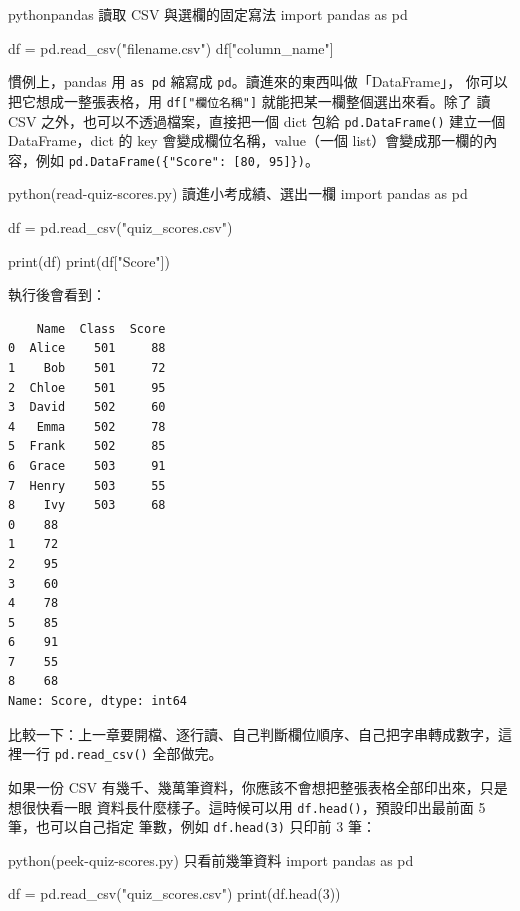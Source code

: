 \begin{code}{python}{pandas 讀取 CSV 與選欄的固定寫法}
import pandas as pd

df = pd.read_csv("filename.csv")
df["column_name"]
\end{code}

慣例上，pandas 用 \texttt{as pd} 縮寫成 \texttt{pd}。讀進來的東西叫做「DataFrame」，
你可以把它想成一整張表格，用 \texttt{df["欄位名稱"]} 就能把某一欄整個選出來看。除了
讀 CSV 之外，也可以不透過檔案，直接把一個 dict 包給 \texttt{pd.DataFrame()} 建立一個
DataFrame，dict 的 key 會變成欄位名稱，value（一個 list）會變成那一欄的內容，例如
\texttt{pd.DataFrame(\{"Score": [80, 95]\})}。

\begin{example}{python}{(read-quiz-scores.py) 讀進小考成績、選出一欄}
import pandas as pd

df = pd.read_csv("quiz_scores.csv")

print(df)
print(df["Score"])
\end{example}

執行後會看到：

\begin{verbatim}
    Name  Class  Score
0  Alice    501     88
1    Bob    501     72
2  Chloe    501     95
3  David    502     60
4   Emma    502     78
5  Frank    502     85
6  Grace    503     91
7  Henry    503     55
8    Ivy    503     68
0    88
1    72
2    95
3    60
4    78
5    85
6    91
7    55
8    68
Name: Score, dtype: int64
\end{verbatim}

比較一下：上一章要開檔、逐行讀、自己判斷欄位順序、自己把字串轉成數字，這裡一行
\texttt{pd.read\_csv()} 全部做完。


如果一份 CSV 有幾千、幾萬筆資料，你應該不會想把整張表格全部印出來，只是想很快看一眼
資料長什麼樣子。這時候可以用 \texttt{df.head()}，預設印出最前面 5 筆，也可以自己指定
筆數，例如 \texttt{df.head(3)} 只印前 3 筆：

\begin{example}{python}{(peek-quiz-scores.py) 只看前幾筆資料}
import pandas as pd

df = pd.read_csv("quiz_scores.csv")
print(df.head(3))
\end{example}

